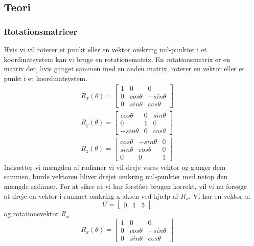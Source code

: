 \subsection{Teori}

\subsubsection{Rotationsmatricer}
Hvis vi vil roterer et punkt eller en vektor omkring nul-punktet i et koordinatsystem kan vi bruge en rotationsmatrix\cite{rotationsmatricer}.
En rotationsmatrix er en matrix der, hvis ganget sammen med en anden matrix, roterer en vektor eller et punkt i et koordinatsystem.
\begin{align}\label{eu_eqn}
R_x(\theta) = 
\begin{bmatrix}
1 & 0 & 0\\ 
0 & cos \theta & - sin \theta\\ 
0 & sin \theta & cos \theta
\end{bmatrix}\\
R_y(\theta) = 
\begin{bmatrix}
cos \theta  & 0 & sin \theta\\ 
0           & 1 & 0\\ 
-sin \theta & 0 & cos \theta
\end{bmatrix}\\
R_z(\theta) = 
\begin{bmatrix}
cos \theta & - sin \theta & 0\\ 
sin \theta & cos \theta & 0\\
0 & 0 & 1
\end{bmatrix}
\end{align}
Indsætter vi mængden af radianer vi vil dreje vores vektor og ganger dem sammen, burde vektoren bliver drejet omkring nul-punktet med netop den mængde radianer.
For at sikre at vi har forstået brugen korrekt, vil vi nu forsøge at dreje en vektor i rummet omkring x-aksen ved hjælp af $R_x$. 
Vi har en vektor u:
\begin{equation}
		U=
	\begin{bmatrix}
		0 & 1 & 5
	\end{bmatrix}
\end{equation}
og rotationsvektor \begin{math}R_x\end{math}
\begin{equation}
		R_x(\theta) = 
	\begin{bmatrix}
		1 & 0 & 0\\ 
		0 & cos \theta & - sin \theta\\ 
		0 & sin \theta & cos \theta
	\end{bmatrix}
\end{equation}
